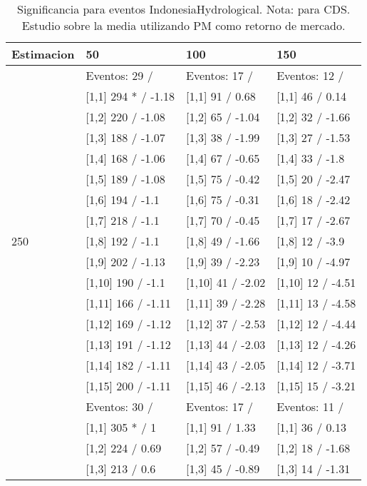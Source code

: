\begin{table}

\caption{Significancia para eventos IndonesiaHydrological. Nota: para CDS. Estudio sobre la media utilizando PM como retorno de mercado.}
\centering
\begin{tabular}[t]{llll}
\toprule
Estimacion & 50 & 100 & 150\\
\midrule
 & Eventos:  29 / & Eventos:  17 / & Eventos:  12 /\\
 & {}[1,1] 294 * / -1.18 & {}[1,1] 91  / 0.68 & {}[1,1] 46  / 0.14\\
 & {}[1,2] 220  / -1.08 & {}[1,2] 65  / -1.04 & {}[1,2] 32  / -1.66\\
 & {}[1,3] 188  / -1.07 & {}[1,3] 38  / -1.99 & {}[1,3] 27  / -1.53\\
 & {}[1,4] 168  / -1.06 & {}[1,4] 67  / -0.65 & {}[1,4] 33  / -1.8\\
\addlinespace
 & {}[1,5] 189  / -1.08 & {}[1,5] 75  / -0.42 & {}[1,5] 20  / -2.47\\
 & {}[1,6] 194  / -1.1 & {}[1,6] 75  / -0.31 & {}[1,6] 18  / -2.42\\
 & {}[1,7] 218  / -1.1 & {}[1,7] 70  / -0.45 & {}[1,7] 17  / -2.67\\
250 & {}[1,8] 192  / -1.1 & {}[1,8] 49  / -1.66 & {}[1,8] 12  / -3.9\\
 & {}[1,9] 202  / -1.13 & {}[1,9] 39  / -2.23 & {}[1,9] 10  / -4.97\\
\addlinespace
 & {}[1,10] 190  / -1.1 & {}[1,10] 41  / -2.02 & {}[1,10] 12  / -4.51\\
 & {}[1,11] 166  / -1.11 & {}[1,11] 39  / -2.28 & {}[1,11] 13  / -4.58\\
 & {}[1,12] 169  / -1.12 & {}[1,12] 37  / -2.53 & {}[1,12] 12  / -4.44\\
 & {}[1,13] 191  / -1.12 & {}[1,13] 44  / -2.03 & {}[1,13] 12  / -4.26\\
 & {}[1,14] 182  / -1.11 & {}[1,14] 43  / -2.05 & {}[1,14] 12  / -3.71\\
\addlinespace
 & {}[1,15] 200  / -1.11 & {}[1,15] 46  / -2.13 & {}[1,15] 15  / -3.21\\
 & Eventos:  30 / & Eventos:  17 / & Eventos:  11 /\\
 & {}[1,1] 305 * / 1 & {}[1,1] 91  / 1.33 & {}[1,1] 36  / 0.13\\
 & {}[1,2] 224  / 0.69 & {}[1,2] 57  / -0.49 & {}[1,2] 18  / -1.68\\
 & {}[1,3] 213  / 0.6 & {}[1,3] 45  / -0.89 & {}[1,3] 14  / -1.31\\

\end{tabular}
\end{table}
